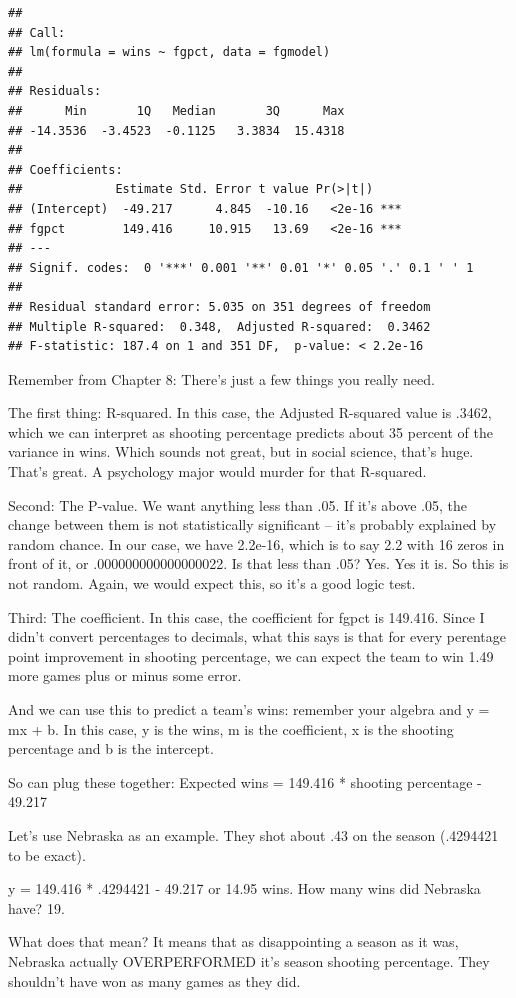 \documentclass[]{book}
\begin{document}
\begin{verbatim}
## 
## Call:
## lm(formula = wins ~ fgpct, data = fgmodel)
## 
## Residuals:
##      Min       1Q   Median       3Q      Max 
## -14.3536  -3.4523  -0.1125   3.3834  15.4318 
## 
## Coefficients:
##             Estimate Std. Error t value Pr(>|t|)    
## (Intercept)  -49.217      4.845  -10.16   <2e-16 ***
## fgpct        149.416     10.915   13.69   <2e-16 ***
## ---
## Signif. codes:  0 '***' 0.001 '**' 0.01 '*' 0.05 '.' 0.1 ' ' 1
## 
## Residual standard error: 5.035 on 351 degrees of freedom
## Multiple R-squared:  0.348,  Adjusted R-squared:  0.3462 
## F-statistic: 187.4 on 1 and 351 DF,  p-value: < 2.2e-16
\end{verbatim}

Remember from Chapter 8: There's just a few things you really need.

The first thing: R-squared. In this case, the Adjusted R-squared value
is .3462, which we can interpret as shooting percentage predicts about
35 percent of the variance in wins. Which sounds not great, but in
social science, that's huge. That's great. A psychology major would
murder for that R-squared.

Second: The P-value. We want anything less than .05. If it's above .05,
the change between them is not statistically significant -- it's
probably explained by random chance. In our case, we have 2.2e-16, which
is to say 2.2 with 16 zeros in front of it, or .000000000000000022. Is
that less than .05? Yes. Yes it is. So this is not random. Again, we
would expect this, so it's a good logic test.

Third: The coefficient. In this case, the coefficient for fgpct is
149.416. Since I didn't convert percentages to decimals, what this says
is that for every perentage point improvement in shooting percentage, we
can expect the team to win 1.49 more games plus or minus some error.

And we can use this to predict a team's wins: remember your algebra and
y = mx + b. In this case, y is the wins, m is the coefficient, x is the
shooting percentage and b is the intercept.

So can plug these together: Expected wins = 149.416 * shooting
percentage - 49.217

Let's use Nebraska as an example. They shot about .43 on the season
(.4294421 to be exact).

y = 149.416 * .4294421 - 49.217 or 14.95 wins. How many wins did
Nebraska have? 19.

What does that mean? It means that as disappointing a season as it was,
Nebraska actually OVERPERFORMED it's season shooting percentage. They
shouldn't have won as many games as they did.
\end{document}
